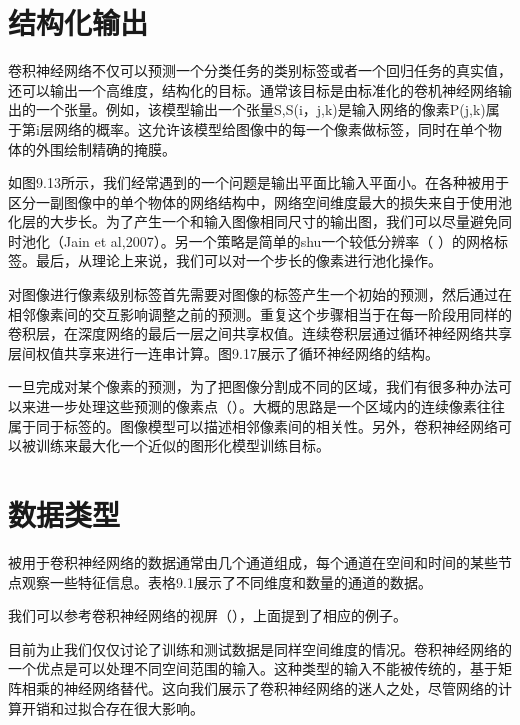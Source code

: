 
\section{结构化输出}
\label{sec:9.6}


    卷积神经网络不仅可以预测一个分类任务的类别标签或者一个回归任务的真实值，还可以输出一个高维度，结构化的目标。通常该目标是由标准化的卷机神经网络输出的一个张量。例如，该模型输出一个张量S,S(i，j,k)是输入网络的像素P(j,k)属于第i层网络的概率。这允许该模型给图像中的每一个像素做标签，同时在单个物体的外围绘制精确的掩膜。

如图9.13所示，我们经常遇到的一个问题是输出平面比输入平面小。在各种被用于区分一副图像中的单个物体的网络结构中，网络空间维度最大的损失来自于使用池化层的大步长。为了产生一个和输入图像相同尺寸的输出图，我们可以尽量避免同时池化（Jain et al,2007）。另一个策略是简单的shu一个较低分辨率（ ）的网格标签。最后，从理论上来说，我们可以对一个步长的像素进行池化操作。

对图像进行像素级别标签首先需要对图像的标签产生一个初始的预测，然后通过在相邻像素间的交互影响调整之前的预测。重复这个步骤相当于在每一阶段用同样的卷积层，在深度网络的最后一层之间共享权值。连续卷积层通过循环神经网络共享层间权值共享来进行一连串计算。图9.17展示了循环神经网络的结构。

一旦完成对某个像素的预测，为了把图像分割成不同的区域，我们有很多种办法可以来进一步处理这些预测的像素点（）。大概的思路是一个区域内的连续像素往往属于同于标签的。图像模型可以描述相邻像素间的相关性。另外，卷积神经网络可以被训练来最大化一个近似的图形化模型训练目标。

\section{数据类型}
\label{sec:9.7}

      被用于卷积神经网络的数据通常由几个通道组成，每个通道在空间和时间的某些节点观察一些特征信息。表格9.1展示了不同维度和数量的通道的数据。

我们可以参考卷积神经网络的视屏（），上面提到了相应的例子。
  
  
目前为止我们仅仅讨论了训练和测试数据是同样空间维度的情况。卷积神经网络的一个优点是可以处理不同空间范围的输入。这种类型的输入不能被传统的，基于矩阵相乘的神经网络替代。这向我们展示了卷积神经网络的迷人之处，尽管网络的计算开销和过拟合存在很大影响。
 
